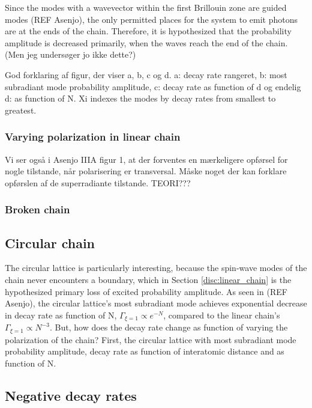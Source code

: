 \documentclass{article}
\begin{document}
Since the modes with a wavevector within the first Brillouin zone are guided modes (REF Asenjo), the only permitted places for the system to emit photons are at the ends of the chain. Therefore, it is hypothesized that the probability amplitude is decreased primarily, when the waves reach the end of the chain. (Men jeg undersøger jo ikke dette?)

God forklaring af figur, der viser a, b, c og d. a: decay rate rangeret, b: most subradiant mode probability amplitude, c: decay rate as function of d og endelig d: as function of N. Xi indexes the modes by decay rates from smallest to greatest. 

\subsubsection{Varying polarization in linear chain}\label{disc:linear_chain_varypola}

Vi ser også i Asenjo IIIA figur 1, at der forventes en mærkeligere opførsel for nogle tilstande, når polarisering er transversal. Måske noget der kan forklare opførslen af de superradiante tilstande. TEORI???

\subsubsection{Broken chain}\label{disc:linear_broken}

\subsection{Circular chain}\label{disc:circular}

The circular lattice is particularly interesting, because the spin-wave modes of the chain never encounters a boundary, which in Section \ref{disc:linear_chain} is the hypothesized primary loss of excited probability amplitude. As seen in (REF Asenjo), the circular lattice's most subradiant mode achieves exponential decrease in decay rate as function of N, $\Gamma_{\xi = 1} \propto e^{-N}$, compared to the linear chain's $\Gamma_{\xi=1} \propto N^{-3}$. But, how does the decay rate change as function of varying the polarization of the chain? First, the circular lattice with most subradiant mode probability amplitude, decay rate as function of interatomic distance and as function of N. 

\subsection{Negative decay rates}
\end{document}

